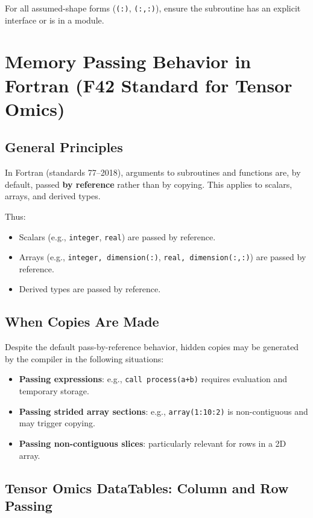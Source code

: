 \documentclass{article}
\begin{document}
\noindent For all assumed-shape forms (\texttt{(:)}, \texttt{(:,:)}), ensure the subroutine has an explicit interface or is in a module.


\section{Memory Passing Behavior in Fortran (F42 Standard for Tensor Omics)}

\subsection{General Principles}

In Fortran (standards 77--2018), arguments to subroutines and functions are, by default, passed \textbf{by reference} rather than by copying.  
This applies to scalars, arrays, and derived types.

Thus:

\begin{itemize}
    \item Scalars (e.g., \texttt{integer}, \texttt{real}) are passed by reference.
    \item Arrays (e.g., \texttt{integer, dimension(:)}, \texttt{real, dimension(:,:)}) are passed by reference.
    \item Derived types are passed by reference.
\end{itemize}

\subsection{When Copies Are Made}

Despite the default pass-by-reference behavior, hidden copies may be generated by the compiler in the following situations:

\begin{itemize}
    \item \textbf{Passing expressions}: e.g., \texttt{call process(a+b)} requires evaluation and temporary storage.
    \item \textbf{Passing strided array sections}: e.g., \texttt{array(1:10:2)} is non-contiguous and may trigger copying.
    \item \textbf{Passing non-contiguous slices}: particularly relevant for rows in a 2D array.
\end{itemize}

\subsection{Tensor Omics DataTables: Column and Row Passing}
\end{document}
